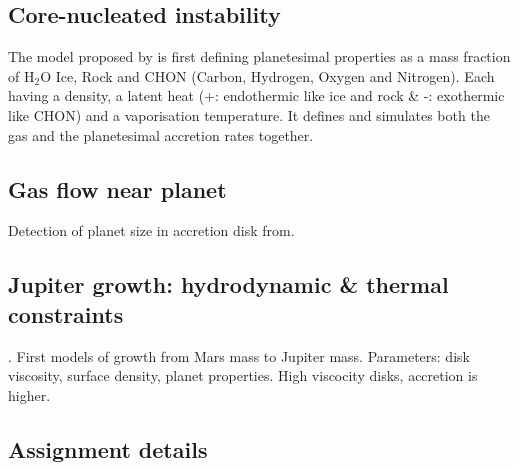 \documentclass[12pt]{article} %
\begin{document}
\subsection{Core-nucleated instability}\vspace{-1ex}\bigskip

\noindent The model proposed by \cite{pollack1996formation} is first defining planetesimal properties as a mass fraction of H$_2$O Ice, Rock and CHON (Carbon, Hydrogen, Oxygen and Nitrogen). Each having a density, a latent heat (+: endothermic like ice and rock \& -: exothermic like CHON) and a vaporisation temperature. It defines and simulates both the gas and the planetesimal accretion rates together. \newline

\subsection{Gas flow near planet}\vspace{-1ex}\bigskip

Detection of planet size in accretion disk from\cite{bate2003three}.\newline

\subsection{Jupiter growth: hydrodynamic \& thermal constraints}\vspace{-1ex}\bigskip

\cite{lissauer2009models}. First models of growth from Mars mass to Jupiter mass. Parameters: disk viscosity, surface density, planet properties.\newline
High viscocity disks, accretion is higher.

\subsection{Assignment details}\vspace{-1ex}\bigskip
\end{document}
